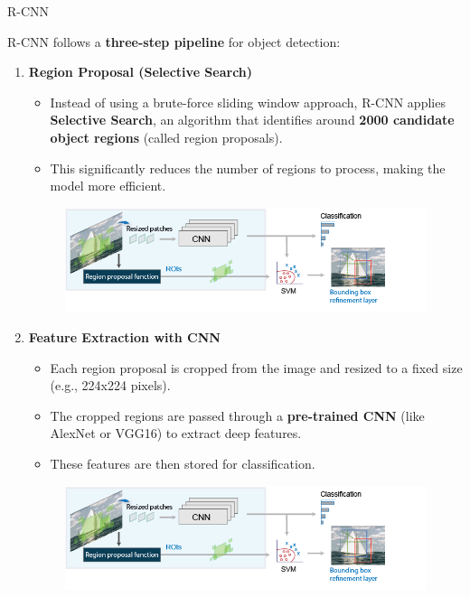 \begin{frame}[allowframebreaks]{R-CNN}
\framebreak

    \large R-CNN follows a \textbf{three-step pipeline} for object detection:
        \begin{enumerate}
            \item \textbf{Region Proposal (Selective Search)}
            \begin{itemize}
                \item Instead of using a brute-force sliding window approach, R-CNN applies \textbf{Selective Search}, an algorithm that identifies around \textbf{2000 candidate object regions} (called region proposals).
                \item This significantly reduces the number of regions to process, making the model more efficient.
            \end{itemize}
            \begin{figure}
                \centering
                \includegraphics[width=1.0\textwidth,height=0.4\textheight,keepaspectratio]{images/object-detect/r-cnn-region-proposal.png}
            \end{figure}
\framebreak
            \item \textbf{Feature Extraction with CNN}
            \begin{itemize}
                \item Each region proposal is cropped from the image and resized to a fixed size (e.g., 224x224 pixels).
                \item The cropped regions are passed through a \textbf{pre-trained CNN} (like AlexNet or VGG16) to extract deep features.
                \item These features are then stored for classification.
            \end{itemize}
            \begin{figure}
                \centering
                \includegraphics[width=1.0\textwidth,height=0.4\textheight,keepaspectratio]{images/object-detect/r-cnn-region-proposal.png}

\end{figure}
\end{enumerate}
\end{frame}
